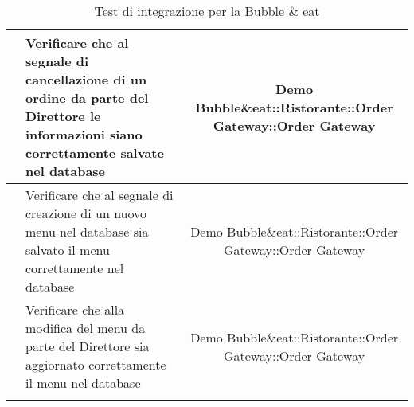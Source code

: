 \begin{longtable}{|c|P{9cm}|c|}
	\hline {} & Verificare che al segnale di cancellazione di un ordine da parte del Direttore le informazioni siano correttamente salvate nel database & Demo Bubble\&eat::Ristorante::Order Gateway::Order Gateway  \\
	\hline {} & Verificare che al segnale di creazione di un nuovo menu nel database sia salvato il menu correttamente nel database & Demo Bubble\&eat::Ristorante::Order Gateway::Order Gateway  \\
	\hline {} & Verificare che alla modifica del menu da parte del Direttore sia aggiornato correttamente il menu nel database & Demo Bubble\&eat::Ristorante::Order Gateway::Order Gateway  \\
	\hline
	\caption{Test di integrazione per la Bubble \& eat}
\end{longtable}
